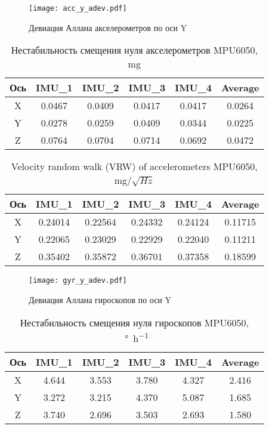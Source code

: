 \begin{figure}[h!]
	\centering
	\texttt{[image: acc\_y\_adev.pdf]}
	\caption{Девиация Аллана акселерометров по оси Y}
	\label{fig:acc_y_allan}
\end{figure}

\begin{table}[h!]
	\centering
	\caption{Нестабильность смещения нуля акселерометров MPU6050, mg}
	\begin{tabular}{| c | c | c | c | c | c |}
	\hline
	Ось & IMU\_1 & IMU\_2 & IMU\_3 & IMU\_4 & Average \\ \hline
	X & 0.0467 & 0.0409 & 0.0417 & 0.0417 & 0.0264 \\ \hline
	Y & 0.0278 & 0.0259 & 0.0409 & 0.0344 & 0.0225 \\ \hline
	Z & 0.0764 & 0.0704 & 0.0714 & 0.0692 & 0.0472 \\
	\hline
	\end{tabular}
	\label{table:acc_bias}
\end{table}

\begin{table}[h!]
	\centering
	\caption{Velocity random walk (VRW) of accelerometers MPU6050, mg/$\sqrt{Hz}$}
	\begin{tabular}{| c | c | c | c | c | c |}
	\hline
	Ось & IMU\_1 & IMU\_2 & IMU\_3 & IMU\_4 & Average \\ \hline
	X & 0.24014 & 0.22564 & 0.24332 & 0.24124 & 0.11715 \\ \hline
	Y & 0.22065 & 0.23029 & 0.22929 & 0.22040 & 0.11211 \\ \hline
	Z & 0.35402 & 0.35872 & 0.36701 & 0.37358 & 0.18599 \\
	\hline
	\end{tabular}
	\label{table:acc_vrw}
\end{table}


\begin{figure}[h!]
	\centering
	\texttt{[image: gyr\_y\_adev.pdf]}
	\caption{Девиация Аллана гироскопов по оси Y}
	\label{fig:gyr_y_allan}
\end{figure}

\begin{table}[h!]
	\centering
	\caption{Нестабильность смещения нуля гироскопов MPU6050, \SI[per-mode=symbol]{}{\degree\per\hour}}
	\begin{tabular}{| c | c | c | c | c | c |}
	\hline
	Ось & IMU\_1 & IMU\_2 & IMU\_3 & IMU\_4 & Average \\ \hline
	X & 4.644 & 3.553 & 3.780 & 4.327 & 2.416 \\ \hline
	Y & 3.272 & 3.215 & 4.370 & 5.087 & 1.685 \\ \hline
	Z & 3.740 & 2.696 & 3.503 & 2.693 & 1.580 \\
	\hline
	\end{tabular}
	\label{table:gyro_bias}
\end{table}

